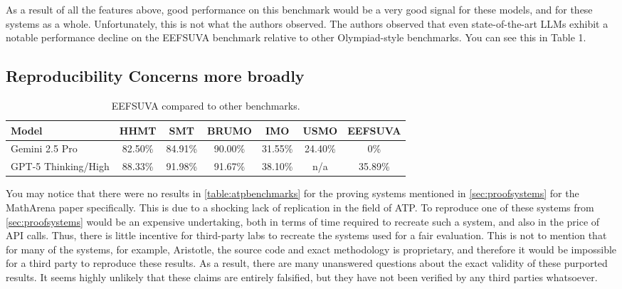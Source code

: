 \documentclass[12pt, letterpaper]{article}
\begin{document}
As a result of all the features above, good performance on this benchmark would be a very good signal for these models, and for these systems as a whole. Unfortunately, this is not what the authors observed. The authors observed that even state-of-the-art LLMs exhibit a notable performance decline on the EEFSUVA benchmark relative to other Olympiad-style benchmarks. \citep{khatibi2025eefsuvanewmathematicalolympiad} You can see this in Table 1.


\subsection{Reproducibility Concerns more broadly}
\begin{table}[h]
\centering
\begin{tabular}{lcccccc}
\toprule
Model & HHMT & SMT & BRUMO & IMO &USMO & EEFSUVA \\
\midrule
Gemini 2.5 Pro      & 82.50\% & 84.91\%  & 90.00\% & 31.55\% &24.40\% &0\% \\
GPT-5 Thinking/High & 88.33\%  & 91.98\% & 91.67\% & 38.10\% &n/a & 35.89\%  \\
\bottomrule
\end{tabular}
\caption{EEFSUVA compared to other benchmarks. \citet{khatibi2025eefsuvanewmathematicalolympiad}}
\end{table}
\label{table:atpbenchmarks}

You may notice that there were no results in \autoref{table:atpbenchmarks} for the proving systems mentioned in \autoref{sec:proofsystems} for the MathArena paper specifically. This is due to a shocking lack of replication in the field of ATP. To reproduce one of these systems from \autoref{sec:proofsystems} would be an expensive undertaking, both in terms of time required to recreate such a system, and also in the price of API calls. Thus, there is little incentive for third-party labs to recreate the systems used for a fair evaluation. This is not to mention that for many of the systems, for example, Aristotle, the source code and exact methodology is proprietary, and therefore it would be impossible for a third party to reproduce these results. As a result, there are many unanswered questions about the exact validity of these purported results. It seems highly unlikely that these claims are entirely falsified, but they have not been verified by any third parties whatsoever.
\end{document}
